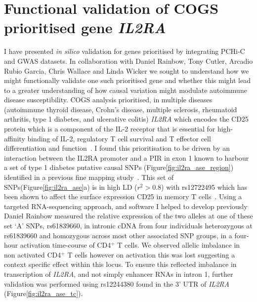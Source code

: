 \documentclass[a4paper,11pt]{report}
\begin{document}
\section{Functional validation of COGS prioritised gene \textit{IL2RA}}
I have presented \textit{in silico} validation for genes prioritised by integrating PCHi-C and GWAS datasets. In collaboration with Daniel Rainbow, Tony Cutler, Arcadio Rubio Garcia, Chris Wallace and Linda Wicker we sought to understand how we might functionally validate one such prioritised gene and whether this might lead to a greater understanding of how causal variation might modulate autoimmune disease susceptibility. COGS analysis prioritised, in multiple diseases (autoimmune thyroid disease, Crohn's disease, multiple sclerosis, rheumatoid arthritis, type 1 diabetes, and ulcerative colitis) \textit{IL2RA} which encodes the CD25 protein which is a component of the IL-2 receptor that is essential for high-affinity binding of IL-2, regulatory T cell survival and T effector cell differentiation and function~\citep{LiaoLinLeonard2013}. I found this prioritisation to be driven by an interaction between the IL2RA promoter and a PIR in exon 1 known to harbour a set of type 1 diabetes putative causal SNPs (Figure\ref{fig:il2ra_ase_region}) identified in a previous fine mapping study~\citep{WallaceCutlerPontikosEtAl2015}. This  set of SNPs(Figure\ref{fig:il2ra_ase}a) is in high LD ($r^{2} > 0.8$) with rs12722495 which has been shown to affect the surface expression CD25 in memory T cells~\citep{DendrouPlagnolFungEtAl2009}. Using a targeted RNA-sequencing approach, and software I helped to develop previously~\citep{RainbowYangBurrenEtAl2015} Daniel Rainbow measured the relative expression of the two alleles at one of these set `A' SNPs, rs61839660, in intronic cDNA from four individuals heterozygous at rs61839660 and homozygous across most other associated SNP groups, in a four-hour activation time-course of CD4$^{+}$ T cells. We observed allelic imbalance in non activated CD4$^{+}$ T cells however on activation this was lost suggesting a context specific effect within this locus. To ensure this reflected imbalance in transcription of \textit{IL2RA}, and not simply enhancer RNAs in intron 1,  further validation was performed using rs12244380 found in the 3' UTR of \textit{IL2RA} (Figure\ref{fig:il2ra_ase_tc}). 
\end{document}
